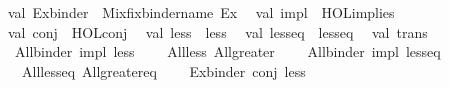 \begin{isabellebody}
\ \ val\ Ex{\isacharunderscore}{\kern0pt}binder\ {\isacharequal}{\kern0pt}\ Mixfix{\isachardot}{\kern0pt}binder{\isacharunderscore}{\kern0pt}name\ \isactrlconstUNDERSCOREsyntax {\isasymopen}Ex{\isasymclose}{\isacharsemicolon}{\kern0pt}\isanewline
\ \ val\ impl\ {\isacharequal}{\kern0pt}\ \isactrlconstUNDERSCOREsyntax {\isasymopen}HOL{\isachardot}{\kern0pt}implies{\isasymclose}{\isacharsemicolon}{\kern0pt}\isanewline
\ \ val\ conj\ {\isacharequal}{\kern0pt}\ \isactrlconstUNDERSCOREsyntax {\isasymopen}HOL{\isachardot}{\kern0pt}conj{\isasymclose}{\isacharsemicolon}{\kern0pt}\isanewline
\ \ val\ less\ {\isacharequal}{\kern0pt}\ \isactrlconstUNDERSCOREsyntax {\isasymopen}less{\isasymclose}{\isacharsemicolon}{\kern0pt}\isanewline
\ \ val\ less{\isacharunderscore}{\kern0pt}eq\ {\isacharequal}{\kern0pt}\ \isactrlconstUNDERSCOREsyntax {\isasymopen}less{\isacharunderscore}{\kern0pt}eq{\isasymclose}{\isacharsemicolon}{\kern0pt}\isanewline
\isanewline
\ \ val\ trans\ {\isacharequal}{\kern0pt}\isanewline
\ \ \ {\isacharbrackleft}{\kern0pt}{\isacharparenleft}{\kern0pt}{\isacharparenleft}{\kern0pt}All{\isacharunderscore}{\kern0pt}binder{\isacharcomma}{\kern0pt}\ impl{\isacharcomma}{\kern0pt}\ less{\isacharparenright}{\kern0pt}{\isacharcomma}{\kern0pt}\isanewline
\ \ \ \ {\isacharparenleft}{\kern0pt}\isactrlsyntaxUNDERSCOREconst {\isasymopen}{\isacharunderscore}{\kern0pt}All{\isacharunderscore}{\kern0pt}less{\isasymclose}{\isacharcomma}{\kern0pt}\ \isactrlsyntaxUNDERSCOREconst {\isasymopen}{\isacharunderscore}{\kern0pt}All{\isacharunderscore}{\kern0pt}greater{\isasymclose}{\isacharparenright}{\kern0pt}{\isacharparenright}{\kern0pt}{\isacharcomma}{\kern0pt}\isanewline
\ \ \ \ {\isacharparenleft}{\kern0pt}{\isacharparenleft}{\kern0pt}All{\isacharunderscore}{\kern0pt}binder{\isacharcomma}{\kern0pt}\ impl{\isacharcomma}{\kern0pt}\ less{\isacharunderscore}{\kern0pt}eq{\isacharparenright}{\kern0pt}{\isacharcomma}{\kern0pt}\isanewline
\ \ \ \ {\isacharparenleft}{\kern0pt}\isactrlsyntaxUNDERSCOREconst {\isasymopen}{\isacharunderscore}{\kern0pt}All{\isacharunderscore}{\kern0pt}less{\isacharunderscore}{\kern0pt}eq{\isasymclose}{\isacharcomma}{\kern0pt}\ \isactrlsyntaxUNDERSCOREconst {\isasymopen}{\isacharunderscore}{\kern0pt}All{\isacharunderscore}{\kern0pt}greater{\isacharunderscore}{\kern0pt}eq{\isasymclose}{\isacharparenright}{\kern0pt}{\isacharparenright}{\kern0pt}{\isacharcomma}{\kern0pt}\isanewline
\ \ \ \ {\isacharparenleft}{\kern0pt}{\isacharparenleft}{\kern0pt}Ex{\isacharunderscore}{\kern0pt}binder{\isacharcomma}{\kern0pt}\ conj{\isacharcomma}{\kern0pt}\ less{\isacharparenright}{\kern0pt}{\isacharcomma}{\kern0pt}\isanewline

\end{isabellebody}
